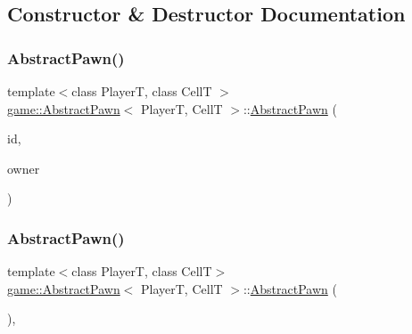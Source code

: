 \subsection{Constructor \& Destructor Documentation}
\mbox{\label{classgame_1_1_abstract_pawn_af1bc0b6647a170f6d4be38a6475757e3}} 
\subsubsection{\texorpdfstring{Abstract\+Pawn()}{AbstractPawn()}\hspace{0.1cm}{\footnotesize\ttfamily [1/2]}}
{\footnotesize\ttfamily template$<$class PlayerT, class CellT $>$ \\
\hyperlink{classgame_1_1_abstract_pawn}{game\+::\+Abstract\+Pawn}$<$ PlayerT, CellT $>$\+::\hyperlink{classgame_1_1_abstract_pawn}{Abstract\+Pawn} (\begin{DoxyParamCaption}\item[{unsigned int}]{id,  }\item[{PlayerT \&}]{owner }\end{DoxyParamCaption})\hspace{0.3cm}{\ttfamily [explicit]}}

\mbox{\label{classgame_1_1_abstract_pawn_af83fab32ac2e13daf3c693d465a061ed}} 
\subsubsection{\texorpdfstring{Abstract\+Pawn()}{AbstractPawn()}\hspace{0.1cm}{\footnotesize\ttfamily [2/2]}}
{\footnotesize\ttfamily template$<$class PlayerT, class CellT$>$ \\
\hyperlink{classgame_1_1_abstract_pawn}{game\+::\+Abstract\+Pawn}$<$ PlayerT, CellT $>$\+::\hyperlink{classgame_1_1_abstract_pawn}{Abstract\+Pawn} (\begin{DoxyParamCaption}\item[{const \hyperlink{classgame_1_1_abstract_pawn}{Abstract\+Pawn}$<$ PlayerT, CellT $>$ \&}]{ }\end{DoxyParamCaption})\hspace{0.3cm}{\ttfamily [explicit]}, {\ttfamily [delete]}}

